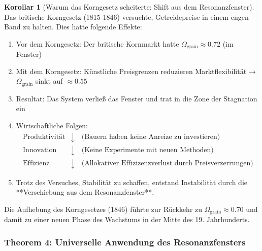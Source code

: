 \documentclass[a4paper, 12pt, twoside, openright]{report}
\theoremstyle{definition}
\theoremstyle{definition}
\newtheorem{korollar}{Korollar}[chapter]
\begin{document}
\begin{korollar}[Warum das Korngesetz scheiterte: Shift aus dem Resonanzfenster]

Das britische Korngesetz (1815-1846) versuchte, Getreidepreise in einem engen Band zu halten. Dies hatte folgende Effekte:

\begin{enumerate}
	\item Vor dem Korngesetz: Der britische Kornmarkt hatte $\Omega_{\text{grain}} \approx 0.72$ (im Fenster)
	
	\item Mit dem Korngesetz: Künstliche Preisgrenzen reduzieren Marktflexibilität → $\Omega_{\text{grain}}$ sinkt auf $\approx 0.55$
	
	\item Resultat: Das System verließ das Fenster und trat in die Zone der Stagnation ein
	
	\item Wirtschaftliche Folgen:
	\begin{align}
	\text{Produktivität} &\downarrow \quad \text{(Bauern haben keine Anreize zu investieren)} \\
	\text{Innovation} &\downarrow \quad \text{(Keine Experimente mit neuen Methoden)} \\
	\text{Effizienz} &\downarrow \quad \text{(Allokativer Effizizenzverlust durch Preisverzerrungen)}
	\end{align}
	
	\item Trotz des Versuches, Stabilität zu schaffen, entstand Instabilität durch die **Verschiebung aus dem Resonanzfenster**.
\end{enumerate}

Die Aufhebung des Korngesetzes (1846) führte zur Rückkehr zu $\Omega_{\text{grain}} \approx 0.70$ und damit zu einer neuen Phase des Wachstums in der Mitte des 19. Jahrhunderts.

\end{korollar}

\subsubsection*{Theorem 4: Universelle Anwendung des Resonanzfensters}
\end{document}
